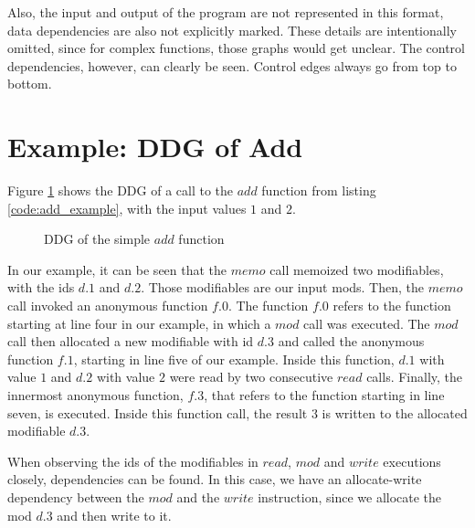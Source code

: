 Also, the input and output of the program are not represented in this format, data dependencies are also not explicitly marked. These details are intentionally omitted, since for complex functions, those graphs would get unclear. The control dependencies, however, can clearly be seen. Control edges always go from top to bottom. 

\section{Example: DDG of Add}

Figure \ref{fig:add_ddg} shows the DDG of a call to the $add$ function from listing \ref{code:add_example}, with the input values $1$ and $2$.

\begin{figure}
\centering
{}
\caption{DDG of the simple $add$ function}
\label{fig:add_ddg}
\end{figure}

In our example, it can be seen that the $memo$ call memoized two modifiables, with the ids $d.1$ and $d.2$. Those modifiables are our input mods. Then, the $memo$ call invoked an anonymous function $f.0$. The function $f.0$ refers to the function starting at line four in our example, in which a $mod$ call was executed. The $mod$ call then allocated a new modifiable with id $d.3$ and called the anonymous function $f.1$, starting in line five of our example. Inside this function, $d.1$ with value $1$ and $d.2$ with value $2$ were read by two consecutive $read$ calls. Finally, the innermost anonymous function, $f.3$, that refers to the function starting in line seven, is executed. Inside this function call, the result $3$ is written to the allocated modifiable $d.3$. 
  
When observing the ids of the modifiables in $read$, $mod$ and $write$ executions closely, dependencies can be found. In this case, we have an allocate-write dependency between the $mod$ and the $write$ instruction, since we allocate the mod $d.3$ and then write to it. 

